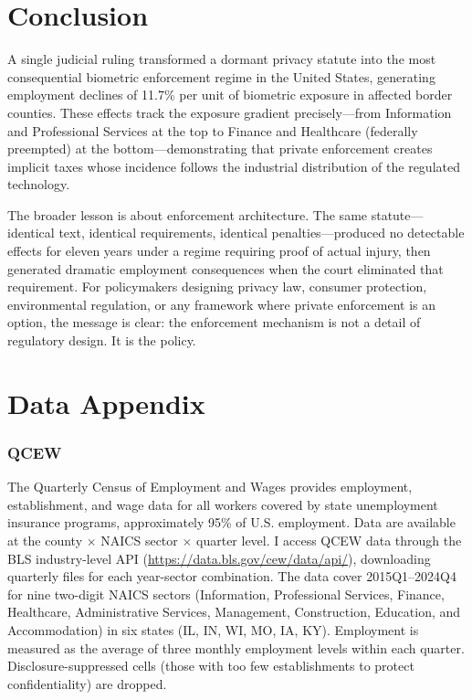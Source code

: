 \documentclass[12pt]{article}
\begin{document}
\section{Conclusion}
\label{sec:conclusion}

A single judicial ruling transformed a dormant privacy statute into the most consequential biometric enforcement regime in the United States, generating employment declines of 11.7\% per unit of biometric exposure in affected border counties. These effects track the exposure gradient precisely---from Information and Professional Services at the top to Finance and Healthcare (federally preempted) at the bottom---demonstrating that private enforcement creates implicit taxes whose incidence follows the industrial distribution of the regulated technology.

The broader lesson is about enforcement architecture. The same statute---identical text, identical requirements, identical penalties---produced no detectable effects for eleven years under a regime requiring proof of actual injury, then generated dramatic employment consequences when the court eliminated that requirement. For policymakers designing privacy law, consumer protection, environmental regulation, or any framework where private enforcement is an option, the message is clear: the enforcement mechanism is not a detail of regulatory design. It is the policy.

\label{apep_main_text_end}



\newpage
\appendix

\section{Data Appendix}
\label{sec:data_appendix}

\subsubsection*{QCEW} The Quarterly Census of Employment and Wages provides employment, establishment, and wage data for all workers covered by state unemployment insurance programs, approximately 95\% of U.S. employment. Data are available at the county $\times$ NAICS sector $\times$ quarter level. I access QCEW data through the BLS industry-level API (\url{https://data.bls.gov/cew/data/api/}), downloading quarterly files for each year-sector combination. The data cover 2015Q1--2024Q4 for nine two-digit NAICS sectors (Information, Professional Services, Finance, Healthcare, Administrative Services, Management, Construction, Education, and Accommodation) in six states (IL, IN, WI, MO, IA, KY). Employment is measured as the average of three monthly employment levels within each quarter. Disclosure-suppressed cells (those with too few establishments to protect confidentiality) are dropped.
\end{document}
